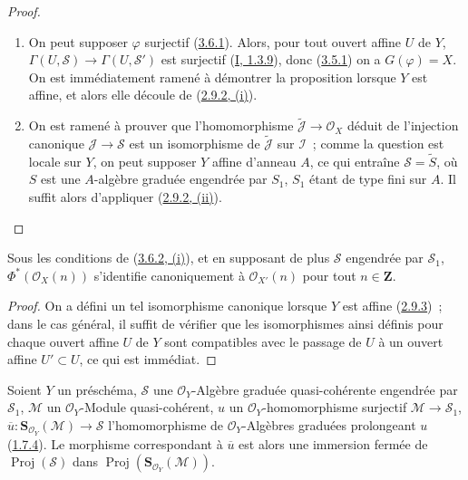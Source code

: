\begin{proof}
\begin{enumerate}
  \item[\rm(i)] On peut supposer $\varphi$ surjectif
    (\hyperref[II.3.6.1-fr]{3.6.1}). Alors, pour tout ouvert affine $U$ de
    $Y$, $\Gamma(U,\mathcal{S})\to\Gamma(U,\mathcal{S}')$ est surjectif
    (\hyperref[I.1.3.9-fr]{I, 1.3.9}), donc
    (\hyperref[II.3.5.1-fr]{3.5.1}) on a $G(\varphi)=X$. On est
    immédiatement ramené à démontrer la proposition lorsque $Y$ est affine,
    et alors elle découle de (\hyperref[II.2.9.2-fr]{2.9.2, (i)}).
  \item[\rm(ii)] On est ramené à prouver que l'homomorphisme
    $\widetilde{\mathcal{J}}\to\mathcal{O}_X$ déduit de l'injection canonique
    $\mathcal{J}\to\mathcal{S}$ est un isomorphisme de
    $\widetilde{\mathcal{J}}$ sur $\mathcal{I}$~; comme la question est locale
    sur $Y$, on peut supposer $Y$ affine d'anneau $A$, ce qui entraîne
    $\mathcal{S}=\widetilde{S}$, où $S$ est une $A$-algèbre graduée engendrée
    par $S_1$, $S_1$ étant de type fini sur $A$. Il suffit alors d'appliquer
    (\hyperref[II.2.9.2-fr]{2.9.2, (ii)}).
\end{enumerate}
\end{proof}

\begin{corollary}[3.6.3]
\label{II.3.6.3-fr}
Sous les conditions de (\hyperref[II.3.6.2-fr]{3.6.2, (i)}), et en supposant
de plus $\mathcal{S}$ engendrée par $\mathcal{S}_1$,
$\Phi^*(\mathcal{O}_X(n))$ s'identifie canoniquement à
$\mathcal{O}_{X'}(n)$ pour tout $n\in\mathbf{Z}$.
\end{corollary}

\begin{proof}
On a défini un tel isomorphisme canonique lorsque $Y$ est affine
(\hyperref[II.2.9.3-fr]{2.9.3})~; dans le cas général, il suffit de vérifier
que les isomorphismes ainsi définis pour chaque ouvert affine $U$ de $Y$ sont
compatibles avec le passage de $U$ à un ouvert affine $U'\subset U$, ce qui
est immédiat.
\end{proof}

\begin{corollary}[3.6.4]
\label{II.3.6.4-fr}
Soient $Y$ un préschéma, $\mathcal{S}$ une $\mathcal{O}_Y$-Algèbre graduée
quasi-cohérente engendrée par $\mathcal{S}_1$, $\mathcal{M}$ un
$\mathcal{O}_Y$-Module quasi-cohérent, $u$ un $\mathcal{O}_Y$-homomorphisme
surjectif $\mathcal{M}\to\mathcal{S}_1$,
$\overline{u}:\mathbf{S}_{\mathcal{O}_Y}(\mathcal{M})\to\mathcal{S}$
l'homomorphisme de $\mathcal{O}_Y$-Algèbres graduées prolongeant $u$
(\hyperref[II.1.7.4-fr]{1.7.4}). Le morphisme correspondant à
$\overline{u}$ est alors une immersion fermée de
$\operatorname{Proj}(\mathcal{S})$ dans
$\operatorname{Proj}(\mathbf{S}_{\mathcal{O}_Y}(\mathcal{M}))$.
\end{corollary}

